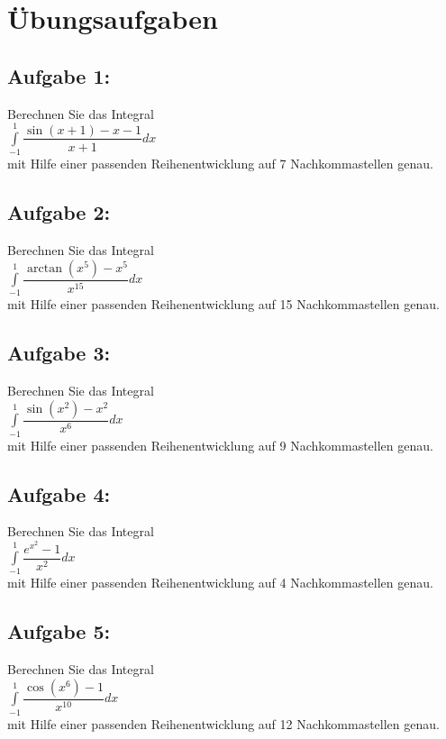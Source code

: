 \documentclass[11pt,final]{scrreprt}
\begin{document}
\newpage
\section{Übungsaufgaben}
\subsection*{Aufgabe 1:}
Berechnen Sie das Integral\\
\hspace*{4em}$ \int\limits_{-1}^1\dfrac{\sin(x+1)-x-1}{x+1} dx $\\
mit Hilfe einer passenden Reihenentwicklung auf 7 Nachkommastellen genau.
\subsection*{Aufgabe 2:}
Berechnen Sie das Integral\\
\hspace*{4em}$ \int\limits_{-1}^1\dfrac{\arctan(x^5)-x^5}{x^{15}} dx $\\
mit Hilfe einer passenden Reihenentwicklung auf 15 Nachkommastellen genau.
\subsection*{Aufgabe 3:}
Berechnen Sie das Integral\\
\hspace*{4em}$ \int\limits_{-1}^1\dfrac{\sin(x^2)-x^2}{x^6} dx $\\
mit Hilfe einer passenden Reihenentwicklung auf 9 Nachkommastellen genau.
\subsection*{Aufgabe 4:}
Berechnen Sie das Integral\\
\hspace*{4em}$ \int\limits_{-1}^1\dfrac{e^{x^2}-1}{x^2} dx $\\
mit Hilfe einer passenden Reihenentwicklung auf 4 Nachkommastellen genau.
\subsection*{Aufgabe 5:}
Berechnen Sie das Integral\\
\hspace*{4em}$ \int\limits_{-1}^1\dfrac{\cos(x^6)-1}{x^{10}} dx $\\
mit Hilfe einer passenden Reihenentwicklung auf 12 Nachkommastellen genau.
\end{document}
